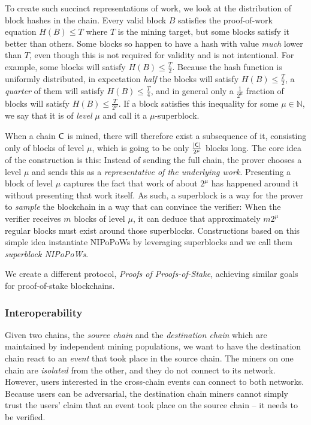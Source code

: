 To create such succinct representations of work, we look at the distribution of
block hashes in the chain. Every valid block $B$ satisfies the proof-of-work
equation $H(B) \leq T$ where $T$ is the mining target, but some blocks satisfy
it better than others. Some blocks so happen to have a hash with value
\emph{much} lower than $T$, even though this is not required for validity and is
not intentional. For example, some blocks will satisfy $H(B) \leq \frac{T}{2}$.
Because the hash function is uniformly distributed, in expectation
\emph{half} the blocks will satisfy $H(B) \leq \frac{T}{2}$, a \emph{quarter} of
them will satisfy $H(B) \leq \frac{T}{4}$, and in general only a $\frac{1}{2^\mu}$ fraction of blocks
will satisfy $H(B) \leq \frac{T}{2^\mu}$. If a block satisfies this inequality
for some $\mu \in \mathbb{N}$, we say that it is of \emph{level} $\mu$ and call
it a $\mu$-superblock.

When a chain $\mathsf{C}$ is mined, there will therefore exist a subsequence of
it, consisting only of blocks of level $\mu$, which is going to be only
$\frac{|\mathsf{C}|}{2^\mu}$ blocks long. The core idea of the construction is this:
Instead of sending the full chain, the prover chooses a level $\mu$ and sends
this as a \emph{representative of the underlying work}. Presenting a block of
level $\mu$ captures the fact that work of about $2^\mu$ has happened around it
without presenting that work itself. As such, a superblock is a way for the
prover to \emph{sample} the blockchain in a way that can convince the verifier:
When the verifier receives $m$ blocks of level $\mu$, it can deduce that
approximately $m 2^\mu$ regular blocks must exist around those superblocks.
Constructions based on this simple idea instantiate NIPoPoWs by leveraging
superblocks and we call them \emph{superblock NIPoPoWs}.

We create a different protocol, \emph{Proofs of Proofs-of-Stake}, achieving
similar goals for proof-of-stake blockchains.

\subsubsection{Interoperability}

Given two chains, the \emph{source chain} and the
\emph{destination chain} which are maintained by independent mining populations,
we want to have the destination chain react to an \emph{event} that took place
in the source chain. The miners on one chain are \emph{isolated} from the other,
and they do not connect to its network. However, users interested in the
cross-chain events can connect to both networks. Because users can be
adversarial, the destination chain miners cannot simply trust the users' claim
that an event took place on the source chain -- it needs to be verified.

